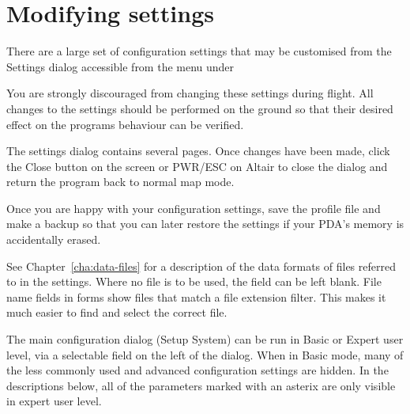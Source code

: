 \documentclass[a4paper,12pt]{refrep}
\begin{document}
\section{Modifying settings}

There are a large set of configuration settings that may be customised
from the Settings dialog accessible from the menu under
\begin{quote}
\blink{}
\end{quote}

You are strongly discouraged from changing these settings during
flight.  \warning  All changes to the settings should be performed on the ground
so that their desired effect on the programs behaviour can be
verified.


The settings dialog contains several pages.  Once changes have been made,
click the Close button on the screen or PWR/ESC on Altair to close the dialog
and return the program back to normal map mode.

\tip Once you are happy with your configuration settings, save the
profile file and make a backup so that you can later restore the
settings if your PDA's memory is accidentally erased.

See Chapter~\ref{cha:data-files} for a description of the data formats
of files referred to in the settings.  Where no file is to be used,
the field can be left blank.  File name fields in forms show files
that match a file extension filter.  This makes it much easier to find
and select the correct file.

The main configuration dialog (Setup System) can be run in Basic or
Expert user level, via a selectable field on the left of the dialog.
When in Basic mode, many of the less commonly used and advanced
configuration settings are hidden.  In the descriptions below,
all of the parameters marked with an asterix are only visible in
expert user level.
\end{document}
